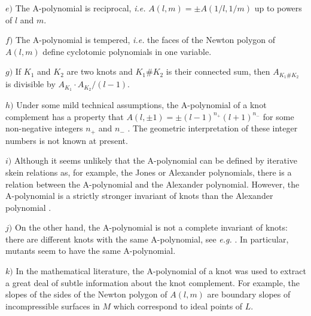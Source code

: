 \item{$e)$}
The A-polynomial is reciprocal, {\it i.e.} $A(l,m)=\pm A(1/l,1/m)$
up to powers of $l$ and $m$.

\item{$f)$}
The A-polynomial is tempered, {\it i.e.} the faces
of the Newton polygon of $A(l,m)$ define cyclotomic
polynomials in one variable.

\item{$g)$}
If $K_1$ and $K_2$ are two knots and $K_1 \# K_2$
is their connected sum, then $A_{K_1 \# K_2}$ is divisible
by $A_{K_1} \cdot A_{K_2}/(l-1)$.

\item{$h)$}
Under some mild technical assumptions, the A-polynomial
of a knot complement has a property that
$A(l,\pm 1) = \pm (l-1)^{n_+} (l+1)^{n_-}$ for some
non-negative integers $n_+$ and $n_-$ \CCGLS.
The geometric interpretation of these integer numbers is not
known at present.

\item{$i)$}
Although it seems unlikely that the A-polynomial can be defined by
iterative skein relations as, for example, the Jones or Alexander polynomials,
there is a relation between the A-polynomial and the Alexander polynomial.
However, the A-polynomial is a strictly stronger invariant of knots
than the Alexander polynomial \CCGLS.

\item{$j)$} On the other hand, the A-polynomial is not
a complete invariant of knots: there are different knots
with the same A-polynomial, see {\it e.g.} \CLrem.
In particular, mutants seem to have the same A-polynomial.

\item{$k)$}
In the mathematical literature, the A-polynomial of a knot was used
to extract a great deal of subtle information about the knot complement.
For example, the slopes of the sides of the Newton polygon
of $A(l,m)$ are boundary slopes of incompressible
surfaces
in $M$ which correspond to ideal points of $L$.

